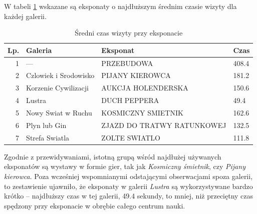 \documentclass[conference]{IEEEtran}
\begin{document}
W tabeli \ref{top_czas_g} wskazane są eksponaty o najdłuższym średnim czasie wizyty dla każdej galerii.
\begin{table}[H]
\caption{Średni czas wizyty przy eksponacie}
\label{top_czas_g}
\centering
\begin{tabular}{|r|l|p{3.4cm}|l|}
\hline
\textbf{Lp.} & \textbf{Galeria} & \textbf{Eksponat} & \textbf{Czas} \\
\hline
1 &                ---    &              PRZEBUDOWA    & 408.4 \\
2 & Czlowiek i Srodowisko &            PIJANY KIEROWCA & 181.2 \\
3 &  Korzenie Cywilizacji &         AUKCJA HOLENDERSKA & 150.6 \\
4 &                Lustra &               DUCH PEPPERA & 49.4 \\
5 &    Nowy Swiat w Ruchu &         KOSMICZNY SMIETNIK & 162.6 \\
6 &          Plyn lub Gin & ZJAZD DO TRATWY RATUNKOWEJ & 132.5 \\
7 &        Strefa Swiatla &              ZOLTE SWIATLO & 111.8 \\
\hline
\end{tabular}
\end{table}
Zgodnie z przewidywaniami, istotną grupą wśród najdłużej używanych eksponatów są wystawy w formie gier, tak jak \textit{Kosmiczny śmietnik}, czy \textit{Pijany kierowca}. Poza wcześniej wspomnianymi odstającymi obserwacjami spoza galerii, to zestawienie ujawniło, że eksponaty w galerii \textit{Lustra} są wykorzystywane bardzo krótko -- najdłuższy czas w tej galerii, 49.4 sekundy, to mniej, niż przeciętny czas spędzony przy eksponacie w obrębie całego centrum nauki. 
\end{document}
